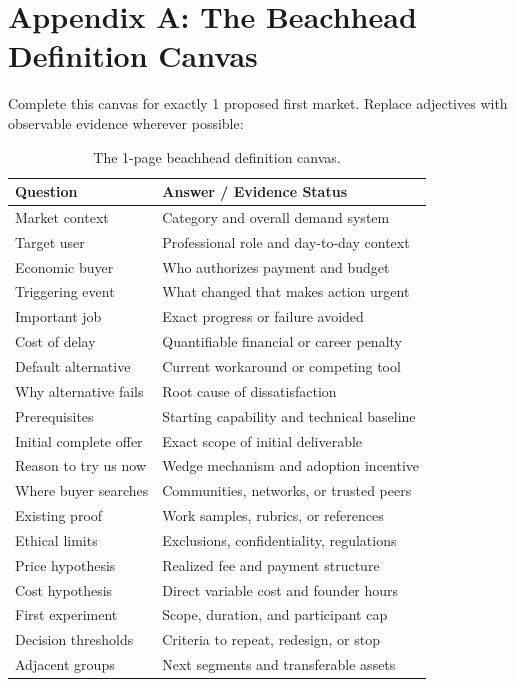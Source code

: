 \section*{Appendix A: The Beachhead Definition Canvas}

Complete this canvas for exactly 1 proposed first market. Replace adjectives with observable evidence wherever possible:

\begin{table}[htbp]
\centering
\small
\begin{tabularx}{\columnwidth}{l X}
\toprule
\textbf{Question} & \textbf{Answer / Evidence Status} \\
\midrule
Market context & Category and overall demand system \\
Target user & Professional role and day-to-day context \\
Economic buyer & Who authorizes payment and budget \\
Triggering event & What changed that makes action urgent \\
Important job & Exact progress or failure avoided \\
Cost of delay & Quantifiable financial or career penalty \\
Default alternative & Current workaround or competing tool \\
Why alternative fails & Root cause of dissatisfaction \\
Prerequisites & Starting capability and technical baseline \\
Initial complete offer & Exact scope of initial deliverable \\
Reason to try us now & Wedge mechanism and adoption incentive \\
Where buyer searches & Communities, networks, or trusted peers \\
Existing proof & Work samples, rubrics, or references \\
Ethical limits & Exclusions, confidentiality, regulations \\
Price hypothesis & Realized fee and payment structure \\
Cost hypothesis & Direct variable cost and founder hours \\
First experiment & Scope, duration, and participant cap \\
Decision thresholds & Criteria to repeat, redesign, or stop \\
Adjacent groups & Next segments and transferable assets \\
\bottomrule
\end{tabularx}
\caption{The 1-page beachhead definition canvas.}
\label{tab:ch7-canvas}
\end{table}

